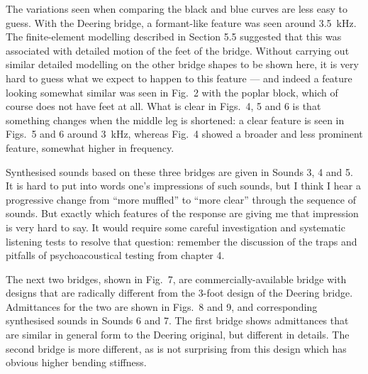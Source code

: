 

  The variations seen when comparing the black and blue curves are less easy to 
  guess. With the Deering bridge, a formant-like feature was seen around 
  3.5~kHz. The finite-element modelling described in Section 5.5 suggested that 
  this was associated with detailed motion of the feet of the bridge. Without 
  carrying out similar detailed modelling on the other bridge shapes to be 
  shown here, it is very hard to guess what we expect to happen to this feature 
  --- and indeed a feature looking somewhat similar was seen in Fig.\ 2 with 
  the poplar block, which of course does not have feet at all. What is clear in 
  Figs.\ 4, 5 and 6 is that something changes when the middle leg is shortened: 
  a clear feature is seen in Figs.\ 5 and 6 around 3~kHz, whereas Fig.\ 4 
  showed a broader and less prominent feature, somewhat higher in frequency. 

  Synthesised sounds based on these three bridges are given in Sounds 3, 4 and 
  5. It is hard to put into words one's impressions of such sounds, but I think 
  I hear a progressive change from ``more muffled'' to ``more clear'' through 
  the sequence of sounds. But exactly which features of the response are giving 
  me that impression is very hard to say. It would require some careful 
  investigation and systematic listening tests to resolve that question: 
  remember the discussion of the traps and pitfalls of psychoacoustical testing 
  from chapter 4. 

  The next two bridges, shown in Fig.\ 7, are commercially-available bridge 
  with designs that are radically different from the 3-foot design of the 
  Deering bridge. Admittances for the two are shown in Figs.\ 8 and 9, and 
  corresponding synthesised sounds in Sounds 6 and 7. The first bridge shows 
  admittances that are similar in general form to the Deering original, but 
  different in details. The second bridge is more different, as is not 
  surprising from this design which has obvious higher bending stiffness. 


